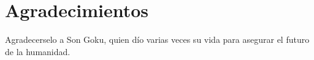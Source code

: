 \chapter*{Agradecimientos}

Agradecerselo a Son Goku, quien dío varias veces su vida para asegurar el futuro de la humanidad.